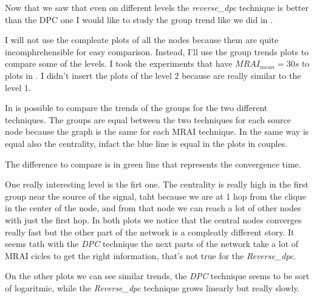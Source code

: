 \documentclass[10pt,conference,letterpaper]{IEEEtran}
\begin{document}
Now that we saw that even on different levels the \textit{reverse\_dpc} technique
is better than the \ac{DPC} one I would like to study the group trend like we did
in .

I will not use the compleate plots of all the nodes because them are quite incomphrehensible
for easy comparison.
Instead, I'll use the group trends plots to compare some of the levels.
I took the experiments that have $MRAI_{mean} = 30s$ to plots in .
I didn't insert the plots of the level 2 because are really similar to the level 1.

In  is possible to compare the trends of the groups
for the two different techniques.
The groups are equal between the two techniques for each source node because the graph
is the same for each \ac{MRAI} technique.
In the same way is equal also the centrality, infact the blue line is equal in 
the plots in couples.

The difference to compare is in green line that represents the convergence time.

One really interesting level is the firt one. The centrality is really high 
in the first group near the source of the signal, taht because we are at 1 hop
from the clique in the center of the node, and from that node we can reach 
a lot of other nodes with just the first hop.
In both plots 
we notice that the central nodes converges really fast but the other part of
the network is a compleatly different story.
It seems tath with the \textit{DPC} technique the next parts of the network take
a lot of \ac{MRAI} cicles to get the right information, that's not true for 
the \textit{Reverse\_dpc}.

On the other plots we can see similar trends, the \textit{DPC} technique seems to
be sort of logaritmic, while the \textit{Reverse\_dpc} technique grows linearly
but really slowly.
\end{document}
